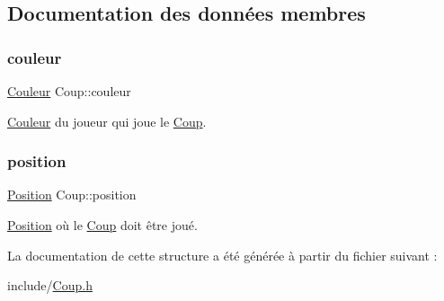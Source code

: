 \subsection{Documentation des données membres}
\mbox{\label{structCoup_a6abc44ab931a3ff7d12b475f5af460f3}} 
\subsubsection{\texorpdfstring{couleur}{couleur}}
{\footnotesize\ttfamily \hyperlink{structCouleur}{Couleur} Coup\+::couleur}



\hyperlink{structCouleur}{Couleur} du joueur qui joue le \hyperlink{structCoup}{Coup}. 

\mbox{\label{structCoup_a53a5b29ee8fde3fa1c9fbc220e2f5a56}} 
\subsubsection{\texorpdfstring{position}{position}}
{\footnotesize\ttfamily \hyperlink{structPosition}{Position} Coup\+::position}



\hyperlink{structPosition}{Position} où le \hyperlink{structCoup}{Coup} doit être joué. 



La documentation de cette structure a été générée à partir du fichier suivant \+:\begin{DoxyCompactItemize}
\item 
include/\hyperlink{Coup_8h}{Coup.\+h}\end{DoxyCompactItemize}

